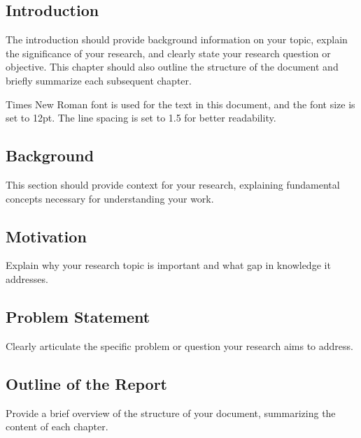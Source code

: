 \documentclass[12pt,a4paper]{report}
\begin{document}
\begin{spacing}{1.5}

    \chapter{Introduction}
    \label{chap:introduction}

    The introduction should provide background information on your topic, explain the significance of your research, and clearly state your research question or objective. This chapter should also outline the structure of the document and briefly summarize each subsequent chapter.

    Times New Roman font is used for the text in this document, and the font size is set to 12pt. The line spacing is set to 1.5 for better readability.

    \section{Background}
    This section should provide context for your research, explaining fundamental concepts necessary for understanding your work.

    \section{Motivation}
    Explain why your research topic is important and what gap in knowledge it addresses.

    \section{Problem Statement}
    Clearly articulate the specific problem or question your research aims to address.

    \section{Outline of the Report}
    Provide a brief overview of the structure of your document, summarizing the content of each chapter.


\end{spacing}
\end{document}
